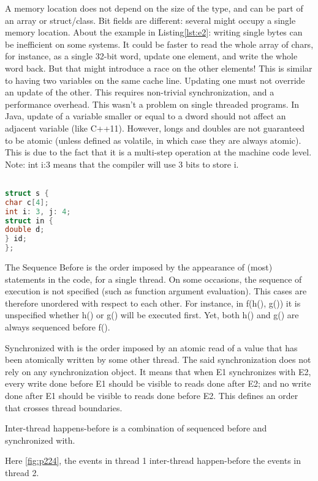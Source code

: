 A memory location does not depend on the size of the type, and can be part of an array or struct/class.
Bit fields are different: several might occupy a single memory location.
About the example in  Listing\ref{lst:e2}: writing single bytes can be inefficient on some systems.
 It could be faster to read the whole array of chars, for instance, as a single 32-bit word,
  update one element, and write the whole word back. But that might introduce a race on the other elements!
This is similar to having two variables on the same cache line. Updating one must not override an update 
of the other. This requires non-trivial synchronization, and a performance overhead. 
This wasn’t a problem on single threaded programs.
In Java, update of a variable smaller or equal to a dword should not affect an adjacent variable (like C++11). 
However, longs and doubles are not guaranteed to be atomic (unless defined as volatile, in which 
case they are always atomic). This is due to the fact that it is a multi-step operation at the machine code level.
Note: int i:3 means that the compiler will use 3 bits to store i.


\begin{lstlisting}[language=C,frame=single, caption=An simple example  ,label = lst:e2]

struct s {
char c[4];
int i: 3, j: 4;
struct in {
double d;
} id;
};
\end{lstlisting}

The Sequence Before is the order imposed by the appearance of (most) statements in the code, for a single thread.
On some occasions, the sequence of execution is not specified (such as function argument evaluation). 
This cases are therefore unordered with respect to each other. For instance, in f(h(), g()) 
it is unspecified whether h() or g() will be executed first. Yet, both h() and g() are always sequenced 
before f().

Synchronized with is the order imposed by an atomic read of a value that has been atomically written
 by some other thread. The said synchronization does not rely on any synchronization object. 
 It means that when E1 synchronizes with E2, every write done before E1 should be visible 
 to reads done after E2; and no write done after E1 should be visible to reads done before E2. 
 This defines an order that crosses thread boundaries.

 Inter-thread happens-before is a combination of sequenced before and synchronized with.


 Here \ref{fig:p224}, the events in thread 1 inter-thread happen-before the events in thread 2.

